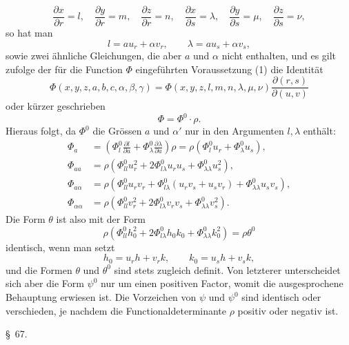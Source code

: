 \documentclass[11pt,a4paper,leqno]{article}
\begin{document}
\[
\frac{\partial x}{\partial r}=l,\quad
\frac{\partial y}{\partial r}=m,\quad
\frac{\partial z}{\partial r}=n,\quad
\frac{\partial x}{\partial s}=\lambda,\quad
\frac{\partial y}{\partial s}=\mu,\quad
\frac{\partial z}{\partial s}=\nu,
\]
so hat man
\[
l=au_r+\alpha v_r,\qquad \lambda=au_s+\alpha v_s,
\]
sowie zwei ähnliche Gleichungen, die aber $a$ und $\alpha$ nicht enthalten,
und es gilt zufolge der für die Function $\Phi$ eingeführten
Voraussetzung (1) die Identität
\[
\Phi(x,y,z,a,b,c,\alpha,\beta,\gamma)
=\Phi(x,y,z,l,m,n,\lambda,\mu,\nu)
\frac{\partial(r,s)}{\partial(u,v)}
\]
oder kürzer geschrieben
\[
\Phi=\Phi^0\cdot\rho.
\]
Hieraus folgt, da $\Phi^0$ die Grössen $a$ und $\alpha'$ nur in den Argumenten
$l,\lambda$ enthält:
\[
\begin{aligned}
\Phi_a
&=\left(\Phi_l^0\frac{\partial l}{\partial a}
+\Phi_\lambda^0\frac{\partial\lambda}{\partial a}\right)\rho
=\rho(\Phi_l^0u_r+\Phi_\lambda^0u_s),\\
\Phi_{aa}
&=\rho\left(\Phi_{ll}^0u_r^2+2\Phi_{l\lambda}^0u_ru_s
+\Phi_{\lambda\lambda}^0u_s^2\right),\\
\Phi_{a\alpha}
&=\rho\left(\Phi_{ll}^0u_rv_r
+\Phi_{l\lambda}^0(u_rv_s+u_sv_r)
+\Phi_{\lambda\lambda}^0u_sv_s\right),\\
\Phi_{\alpha\alpha}
&=\rho\left(\Phi_{ll}^0v_r^2+2\Phi_{l\lambda}^0v_rv_s
+\Phi_{\lambda\lambda}^0v_s^2\right).
\end{aligned}
\]
Die Form $\theta$ ist also mit der Form
\[
\rho\left(\Phi_{ll}^0h_0^2+2\Phi_{l\lambda}^0h_0k_0
+\Phi_{\lambda\lambda}^0k_0^2\right)=\rho\theta^0
\]
identisch, wenn man setzt
\[
h_0=u_rh+v_rk,\qquad k_0=u_sh+v_sk,
\]
und die Formen $\theta$ und $\theta^0$ sind stets zugleich definit. Von letzterer
unterscheidet sich aber die Form $\psi^0$ nur um einen positiven
Factor, womit die ausgesprochene Behauptung erwiesen ist.
Die Vorzeichen von $\psi$ und $\psi^0$ sind identisch oder verschieden,
je nachdem die Functionaldeterminante $\rho$ positiv oder negativ ist.


\begin{center}
{\large \S~67.}
\end{center}
\end{document}
